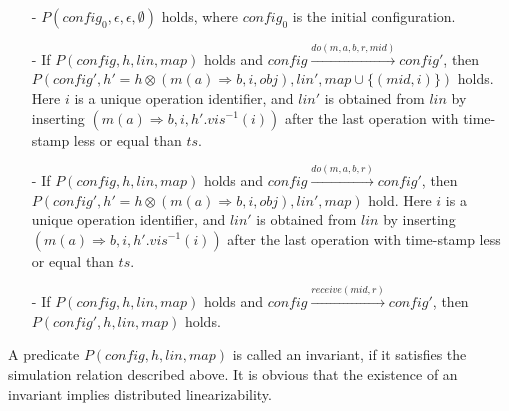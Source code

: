 \begin{itemize}
\setlength{\itemsep}{0.5pt}
\item[-] $P(\mathit{config}_0,\epsilon,\epsilon,\emptyset)$ holds, where $\mathit{config}_0$ is the initial configuration.

\item[-] If $P(\mathit{config},h,\mathit{lin},\mathit{map})$ holds and $\mathit{config} {\xrightarrow{\mathit{do}(m,a,b,r,\mathit{mid})}} \mathit{config}'$, then $P(\mathit{config}', h' = h \otimes (m(a) \Rightarrow b,i,\mathit{obj}),\mathit{lin}',\mathit{map} \cup \{ (\mathit{mid}, i) \})$ holds. Here $i$ is a unique operation identifier, and $\mathit{lin}'$ is obtained from $\mathit{lin}$ by inserting $(m(a) \Rightarrow b,i,h'.\mathit{vis}^{-1}(i))$ after the last operation with time-stamp less or equal than $\mathit{ts}$.

\item[-] If $P(\mathit{config},h,\mathit{lin},\mathit{map})$ holds and $\mathit{config} {\xrightarrow{\mathit{do}(m,a,b,r)}} \mathit{config}'$, then $P(\mathit{config}',h' = h \otimes (m(a) \Rightarrow b,i,\mathit{obj}),\mathit{lin}',\mathit{map})$ hold. Here $i$ is a unique operation identifier, and $\mathit{lin}'$ is obtained from $\mathit{lin}$ by inserting $(m(a) \Rightarrow b,i,h'.\mathit{vis}^{-1}(i))$ after the last operation with time-stamp less or equal than $\mathit{ts}$.

\item[-] If $P(\mathit{config},h,\mathit{lin},\mathit{map})$ holds and $\mathit{config} {\xrightarrow{\mathit{receive}(\mathit{mid},r)}} \mathit{config}'$, then $P(\mathit{config}',h,\mathit{lin},\mathit{map})$ holds.
\end{itemize}

A predicate $P(\mathit{config},h,\mathit{lin},\mathit{map})$ is called an invariant, if it satisfies the simulation relation described above. It is obvious that the existence of an invariant implies distributed linearizability.




